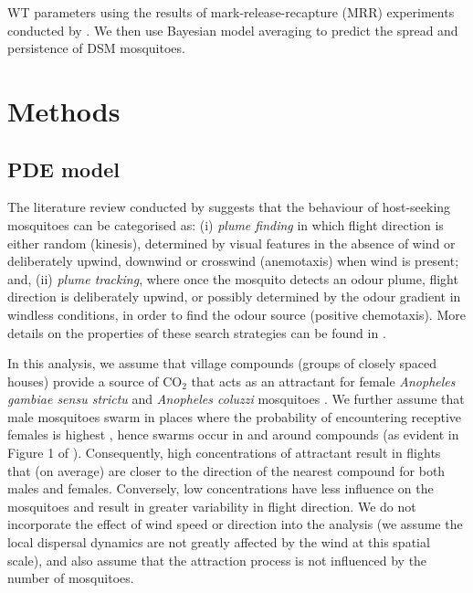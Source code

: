 \documentclass[]{bmcart}
\begin{document}
WT parameters using the results of mark-release-recapture (MRR) experiments conducted by \cite{Epopa2017}. We then use Bayesian model averaging to predict the spread and persistence of DSM mosquitoes. 

\section{Methods}

\subsection{PDE model}

The literature review conducted by \cite{Cummins2012} suggests that the behaviour of host-seeking mosquitoes can be categorised as: (i) \emph{plume finding} in which flight direction is either random (kinesis), determined by visual features in the absence of wind or deliberately upwind, downwind or crosswind (anemotaxis) when wind is present; and, (ii) \emph{plume tracking}, where once the mosquito detects an odour plume, flight direction is deliberately upwind, or possibly determined by the odour gradient in windless conditions, in order to find the odour source (positive chemotaxis). More details on the properties of these search strategies can be found in \cite{Pasternak2009}. 

In this analysis, we assume that village compounds (groups of closely spaced houses) provide a source of CO$_2$ that acts as an attractant for female \emph{Anopheles gambiae sensu strictu} and \emph{Anopheles coluzzi} mosquitoes \cite{DeJong1995, Majeed2017}. We further assume that male mosquitoes swarm in places where the probability of encountering receptive females is highest \citep{Diabate2015}, hence swarms occur in and around compounds (as evident in Figure 1 of \citep[][]{Epopa2017}). Consequently, high concentrations of attractant result in flights that (on average) are closer to the direction of the nearest compound for both males and females. Conversely, low concentrations have less influence on the mosquitoes and result in greater variability in flight direction. We do not incorporate the effect of wind speed or direction into the analysis (we assume the local dispersal dynamics are not greatly affected by the wind at this spatial scale), and also assume that the attraction process is not influenced by the number of mosquitoes.
\end{document}
